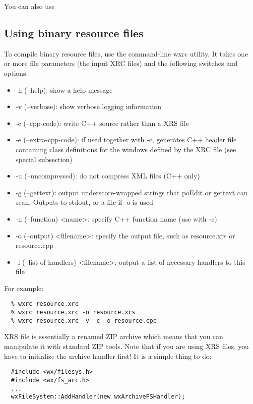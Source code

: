 You can also use 

\subsection{Using binary resource files}\label{binaryresourcefiles}

To compile binary resource files, use the command-line wxrc utility. It takes one or more file parameters
(the input XRC files) and the following switches and options:
\begin{itemize}\itemsep=0pt
\item -h (--help): show a help message
\item -v (--verbose): show verbose logging information
\item -c (--cpp-code): write C++ source rather than a XRS file
\item -e (--extra-cpp-code): if used together with -c, generates C++ header file
containing class definitions for the windows defined by the XRC file (see special subsection) 
\item -u (--uncompressed): do not compress XML files (C++ only)
\item -g (--gettext): output underscore-wrapped strings that poEdit or gettext can scan. Outputs to stdout, or a file if -o is used
\item -n (--function) <name>: specify C++ function name (use with -c)
\item -o (--output) <filename>: specify the output file, such as resource.xrs or resource.cpp
\item -l (--list-of-handlers) <filename>: output a list of necessary handlers to this file
\end{itemize}

For example:
\begin{verbatim}
  % wxrc resource.xrc
  % wxrc resource.xrc -o resource.xrs
  % wxrc resource.xrc -v -c -o resource.cpp
\end{verbatim}


XRS file is essentially a renamed ZIP archive which means that you can manipulate
it with standard ZIP tools. Note that if you are using XRS files, you have
to initialize the  archive handler first! It is a simple
thing to do:

\begin{verbatim}
  #include <wx/filesys.h>
  #include <wx/fs_arc.h>
  ...
  wxFileSystem::AddHandler(new wxArchiveFSHandler);
\end{verbatim}

